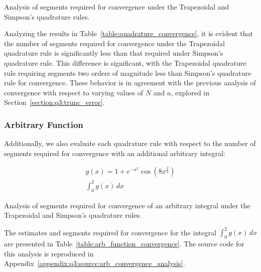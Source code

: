 \documentclass[10pt]{article}
\begin{document}
    

    \begin{table}[h]
        \centering
        \caption{Analysis of segments required for convergence under the Trapezoidal and Simpson's quadrature rules.}
        \label{table:quadrature_convergence}
    \end{table}

    Analyzing the results in Table~\ref{table:quadrature_convergence}, it is evident that the number of segments required for convergence under the Trapezoidal quadrature rule is significantly less than that required under Simpson's quadrature rule. This difference is significant, with the Trapezoidal quadrature rule requiring segments two orders of magnitude less than Simpson's quadrature rule for convergence. These behavior is in agreement with the previous analysis of convergence with respect to varying values of $N$ and $a$, explored in Section~\ref{section:q3:trunc_error}.

        \subsubsection{Arbitrary Function}

        Additionally, we also evaluate each quadrature rule with respect to the number of segments required for convergence with an additional arbitrary integral:
        
        \begin{gather*}
            g(x) = 1 + e^{-x^{2}} \cos{(8x^{\frac{2}{3}})} \\
            \int_0^2 g(x) \, dx
        \end{gather*}

        \begin{table}[h]
            \centering
            \caption{Analysis of segments required for convergence of an arbitrary integral under the Trapezoidal and Simpson's quadrature rules.}
            \label{table:arb_function_convergence}
        \end{table}

        The estimates and segments required for convergence for the integral $\int_0^2 g(x) \, dx$ are presented in Table~\ref{table:arb_function_convergence}. The source code for this analysis is reproduced in Appendix~\ref{appendix:q3:source:arb_convergence_analysis}.
\end{document}
